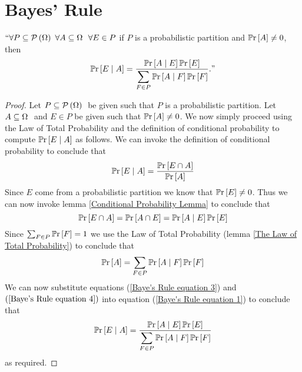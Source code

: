     \section{Bayes' Rule}
        \begin{theorem}
            $``\forall P \subseteq \mathcal{P}\left(\Omega\right) \  \forall A \subseteq \Omega \  \ \forall E \in P$
            if $P$ is a probabilistic partition and $\mathbb{P}\mathrm{r} \left[A\right] \neq 0$, then 
            \[
                \mathbb{P}\mathrm{r}\left[E \mid A\right] = \dfrac{\mathbb{P}\mathrm{r}\left[A \mid E\right] \mathbb{P}\mathrm{r} \left[E\right]}{\displaystyle\sum_{F \in P} \mathbb{P}\mathrm{r}\left[A \mid F\right] \mathbb{P}\mathrm{r} \left[F\right]}."
            \]
        \end{theorem}
        \begin{proof}
            Let $P \subseteq \mathcal{P}\left(\Omega\right) \ $ be given such that $P$ is a probabilistic partition.
            Let $A \subseteq \Omega \ $ and $E \in P$ be given such that $\mathbb{P}\mathrm{r} \left[A\right] \neq 0$. We 
            now simply proceed using  the Law of Total Probability and the definition of
            conditional probability to compute $\mathbb{P}\mathrm{r}\left[E \mid A\right]$ as follows. We can 
            invoke the definition of conditional probability to conclude that
            \begin{equation}
                \mathbb{P}\mathrm{r}\left[E \mid A\right] = \frac{\mathbb{P}\mathrm{r} \left[E \cap A\right]}{\mathbb{P}\mathrm{r} \left[A\right]}
                \label{Baye's Rule equation 1}
            \end{equation}
            Since $E$ come from a probabilistic partition we know that $\mathbb{P}\mathrm{r} \left[E\right] \neq 0$.
            Thus we can now invoke lemma \ref{Conditional Probability Lemma} to conclude that
            \begin{equation}
                \mathbb{P}\mathrm{r} \left[E \cap A\right] = \mathbb{P}\mathrm{r} \left[A \cap E\right] = \mathbb{P}\mathrm{r}\left[A \mid E\right] \mathbb{P}\mathrm{r} \left[E\right]
                \label{Baye's Rule equation 3}
            \end{equation}
            Since $\sum_{F \in P} \mathbb{P}\mathrm{r} \left[F\right] = 1$ we use the Law of Total Probability
            (lemma \ref{The Law of Total Probability}) to conclude that
            \begin{equation}
                \mathbb{P}\mathrm{r} \left[A\right] = \sum_{F \in P} \mathbb{P}\mathrm{r}\left[A \mid F\right] \mathbb{P}\mathrm{r} \left[F\right]
                \label{Baye's Rule equation 4}
            \end{equation}
            We can now substitute equations (\ref{Baye's Rule equation 3})
            and $(\ref{Baye's Rule equation 4})$ into equation (\ref{Baye's Rule equation 1})
            to conclude that
            \[
                \mathbb{P}\mathrm{r}\left[E \mid A\right] = \frac{\mathbb{P}\mathrm{r}\left[A \mid E\right] \mathbb{P}\mathrm{r} \left[E\right]}{\displaystyle\sum_{F \in P} \mathbb{P}\mathrm{r}\left[A \mid F\right] \mathbb{P}\mathrm{r} \left[F\right]}
            \]
            as required. \QED
        \end{proof}
